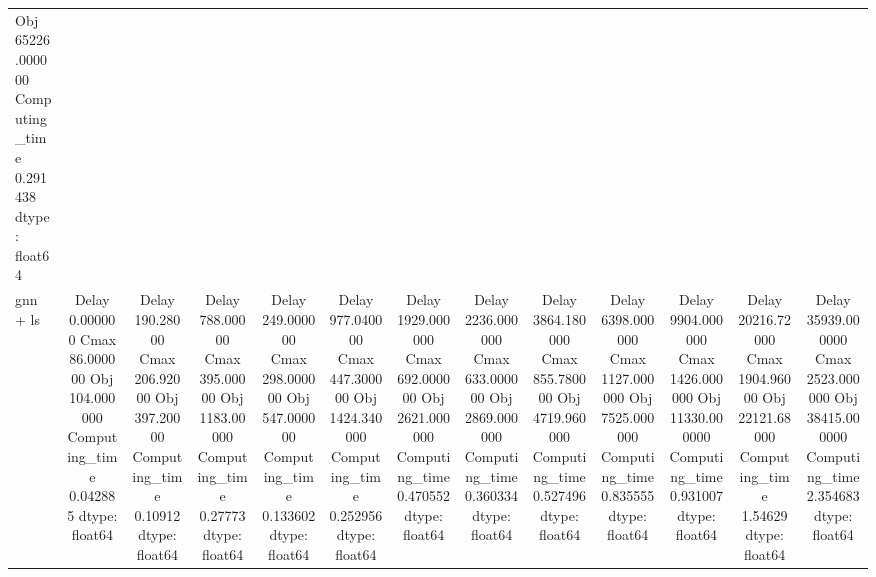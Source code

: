 \begin{tabular}{lcccccccccccc}
Obj               65226.000000
Computing_time        0.291438
dtype: float64 \\
gnn + ls & Delay               0.000000
Cmax               86.000000
Obj               104.000000
Computing_time      0.042885
dtype: float64 & Delay             190.28000
Cmax              206.92000
Obj               397.20000
Computing_time      0.10912
dtype: float64 & Delay              788.00000
Cmax               395.00000
Obj               1183.00000
Computing_time       0.27773
dtype: float64 & Delay             249.000000
Cmax              298.000000
Obj               547.000000
Computing_time      0.133602
dtype: float64 & Delay              977.040000
Cmax               447.300000
Obj               1424.340000
Computing_time       0.252956
dtype: float64 & Delay             1929.000000
Cmax               692.000000
Obj               2621.000000
Computing_time       0.470552
dtype: float64 & Delay             2236.000000
Cmax               633.000000
Obj               2869.000000
Computing_time       0.360334
dtype: float64 & Delay             3864.180000
Cmax               855.780000
Obj               4719.960000
Computing_time       0.527496
dtype: float64 & Delay             6398.000000
Cmax              1127.000000
Obj               7525.000000
Computing_time       0.835555
dtype: float64 & Delay              9904.000000
Cmax               1426.000000
Obj               11330.000000
Computing_time        0.931007
dtype: float64 & Delay             20216.72000
Cmax               1904.96000
Obj               22121.68000
Computing_time        1.54629
dtype: float64 & Delay             35939.000000
Cmax               2523.000000
Obj               38415.000000
Computing_time        2.354683
dtype: float64 \\
\bottomrule
\end{tabular}
